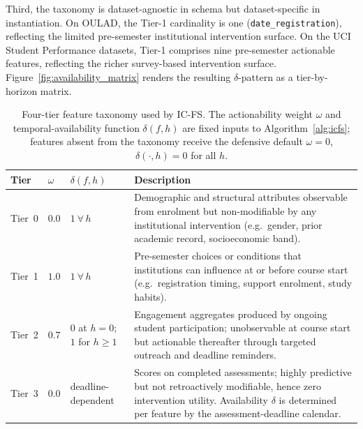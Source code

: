 \documentclass[a4paper,fleqn]{cas-sc}
\begin{document}
Third, the taxonomy is dataset-agnostic in schema but dataset-specific in instantiation. On OULAD, the Tier-1 cardinality is one (\texttt{date\_registration}), reflecting the limited pre-semester institutional intervention surface. On the UCI Student Performance datasets, Tier-1 comprises nine pre-semester actionable features, reflecting the richer survey-based intervention surface. Figure~\ref{fig:availability_matrix} renders the resulting $\delta$-pattern as a tier-by-horizon matrix.

\begin{table}[htbp]
\caption{Four-tier feature taxonomy used by IC-FS. The actionability weight $\omega$ and temporal-availability function $\delta(f, h)$ are fixed inputs to Algorithm~\ref{alg:icfs}; features absent from the taxonomy receive the defensive default $\omega = 0$, $\delta(\cdot, h) = 0$ for all $h$.}
\label{tab:tier_spec}
\centering
\renewcommand{\arraystretch}{1.3}
\begin{tabular}{p{1.1cm} p{0.9cm} p{2.4cm} p{7.8cm}}
\toprule
\textbf{Tier}
    & \textbf{$\omega$}
    & \textbf{$\delta(f, h)$}
    & \textbf{Description} \\
\midrule
Tier~0
    & $0.0$
    & $1\ \forall\, h$
    & Demographic and structural attributes observable from enrolment but
      non-modifiable by any institutional intervention (e.g.\ gender,
      prior academic record, socioeconomic band). \\[4pt]
Tier~1
    & $1.0$
    & $1\ \forall\, h$
    & Pre-semester choices or conditions that institutions can influence at
      or before course start (e.g.\ registration timing, support
      enrolment, study habits). \\[4pt]
Tier~2
    & $0.7$
    & $0$ at $h{=}0$;\newline
      $1$ for $h{\geq}1$
    & Engagement aggregates produced by ongoing student participation;
      unobservable at course start but actionable thereafter through
      targeted outreach and deadline reminders. \\[4pt]
Tier~3
    & $0.0$
    & deadline-\newline dependent
    & Scores on completed assessments; highly predictive but not
      retroactively modifiable, hence zero intervention utility.
      Availability $\delta$ is determined per feature by the
      assessment-deadline calendar. \\
\bottomrule
\end{tabular}
\end{table}
\end{document}

